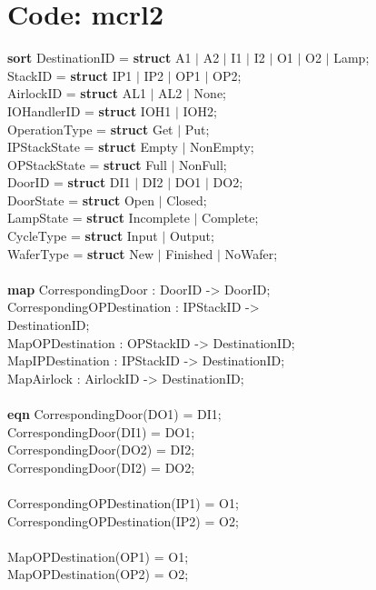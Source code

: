 \documentclass[a4paper,12pt]{article}
\begin{document}
	\section{Code: mcrl2}
	\textbf{sort} DestinationID = \textbf{struct} A1 $|$ A2 $|$ I1 $|$ I2 $|$ O1 $|$ O2 $|$ Lamp;
	\\		  StackID = \textbf{struct} IP1 $|$ IP2 $|$ OP1 $|$ OP2;
	\\		  AirlockID = \textbf{struct} AL1 $|$ AL2 $|$ None;
	\\     IOHandlerID = \textbf{struct} IOH1 $|$ IOH2;
	\\		  OperationType = \textbf{struct} Get $|$ Put;
	\\		  IPStackState = \textbf{struct} Empty $|$ NonEmpty;
	\\		  OPStackState = \textbf{struct} Full $|$ NonFull;
	\\	    DoorID = \textbf{struct} DI1 $|$ DI2 $|$ DO1 $|$ DO2;		
	\\		  DoorState = \textbf{struct} Open $|$ Closed;
	\\			LampState = \textbf{struct} Incomplete $|$ Complete;
	\\		  CycleType = \textbf{struct} Input $|$ Output;
	\\		  WaferType = \textbf{struct} New $|$ Finished $|$ NoWafer;
	\\
	\\\textbf{map} CorrespondingDoor : DoorID -> DoorID;
	\\	  CorrespondingOPDestination : IPStackID -> \\DestinationID;		
	\\	  MapOPDestination : OPStackID -> DestinationID;
	\\		MapIPDestination : IPStackID -> DestinationID;
	\\		MapAirlock : AirlockID -> DestinationID;
	\\
	\\ \textbf{eqn} CorrespondingDoor(DO1) = DI1;
	\\		CorrespondingDoor(DI1) = DO1;
	\\		CorrespondingDoor(DO2) = DI2;
	\\		CorrespondingDoor(DI2) = DO2;
	\\
	\\		CorrespondingOPDestination(IP1) = O1;
	\\		CorrespondingOPDestination(IP2) = O2;
	\\
	\\		MapOPDestination(OP1) = O1;
	\\		MapOPDestination(OP2) = O2;
\end{document}
